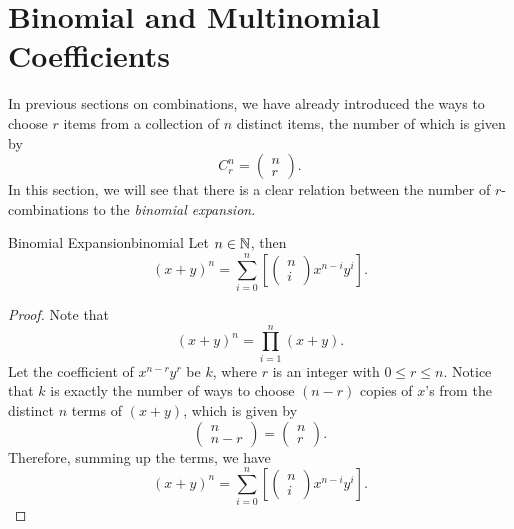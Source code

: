 \documentclass[math]{amznotes}
\theoremstyle{remark}
\begin{document}
\section{Binomial and Multinomial Coefficients}
In previous sections on combinations, we have already introduced the ways to choose $r$ items from a collection of $n$ distinct items, the number of which is given by
\begin{displaymath}
    C^n_r = \begin{pmatrix}
        n \\
        r
    \end{pmatrix}.
\end{displaymath} 
In this section, we will see that there is a clear relation between the number of $r$-combinations to the \textit{binomial expansion}.
\begin{thmbox}{Binomial Expansion}{binomial}
    Let $n \in \mathbb{N}$, then
    \begin{equation*}
        (x + y)^n = \sum_{i = 0}^{n}\left[\begin{pmatrix}
            n \\
            i
        \end{pmatrix}x^{n - i}y^i\right].
    \end{equation*}
    \tcblower   
    \begin{proof}
        Note that 
        \begin{equation*}
            (x + y)^n = \prod_{i = 1}^{n}(x + y).
        \end{equation*}
        Let the coefficient of $x^{n - r}y^r$ be $k$, where $r$ is an integer with $0 \leq r \leq n$. Notice that $k$ is exactly the number of ways to choose $(n - r)$ copies of $x$'s from the distinct $n$ terms of $(x + y)$, which is given by
        \begin{equation*}
            \begin{pmatrix}
                n \\
                n - r
            \end{pmatrix} = \begin{pmatrix}
                n \\
                r
            \end{pmatrix}.
        \end{equation*}
        Therefore, summing up the terms, we have
        \begin{equation*}
            (x + y)^n = \sum_{i = 0}^{n}\left[\begin{pmatrix}
                n \\
                i
            \end{pmatrix}x^{n - i}y^i\right].
        \end{equation*}
    \end{proof}
\end{thmbox}
\end{document}
